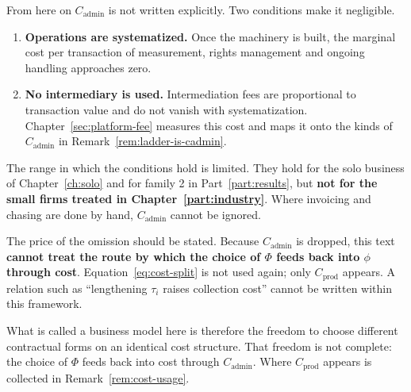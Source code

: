 \begin{remark}
\label{rem:cadmin-negligible}
From here on $C_{\mathrm{admin}}$ is not written explicitly. Two conditions make it
negligible.

\begin{enumerate}[label=(\arabic*)]
\item \textbf{Operations are systematized.}
Once the machinery is built, the marginal cost per transaction of measurement, rights
management and ongoing handling approaches zero.
\item \textbf{No intermediary is used.}
Intermediation fees are proportional to transaction value and do not vanish with
systematization. Chapter~\ref{sec:platform-fee} measures this cost and maps it onto the
kinds of $C_{\mathrm{admin}}$ in Remark~\ref{rem:ladder-is-cadmin}.
\end{enumerate}

The range in which the conditions hold is limited. They hold for the solo business of
Chapter~\ref{ch:solo} and for family 2 in Part~\ref{part:results}, but
\textbf{not for the small firms treated in Chapter~\ref{part:industry}}.
Where invoicing and chasing are done by hand, $C_{\mathrm{admin}}$ cannot be ignored.

The price of the omission should be stated. Because $C_{\mathrm{admin}}$ is dropped, this
text \textbf{cannot treat the route by which the choice of $\Phi$ feeds back into $\phi$
through cost}. Equation~\eqref{eq:cost-split} is not used again; only $C_{\mathrm{prod}}$
appears. A relation such as ``lengthening $\tau_i$ raises collection cost'' cannot be
written within this framework.
\end{remark}

What is called a business model here is therefore the freedom to choose different
contractual forms on an identical cost structure. That freedom is not complete: the choice
of $\Phi$ feeds back into cost through $C_{\mathrm{admin}}$.
Where $C_{\mathrm{prod}}$ appears is collected in Remark~\ref{rem:cost-usage}.


